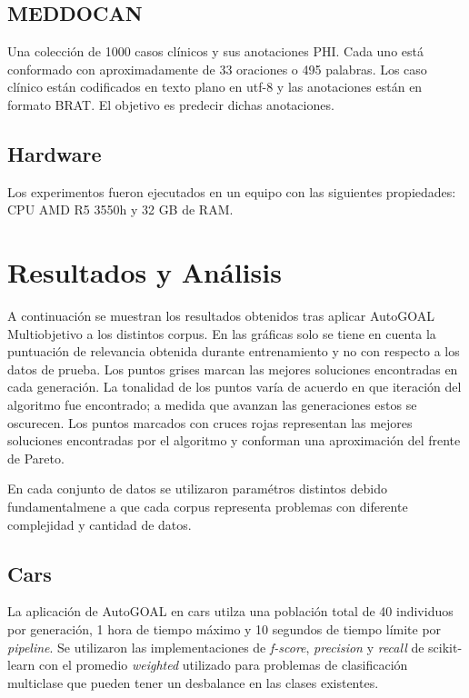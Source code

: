 \subsection{MEDDOCAN}

Una colecci\'on de 1000 casos cl\'inicos y sus anotaciones PHI. Cada uno est\'a conformado con aproximadamente de 33 oraciones o 495 palabras. Los caso cl\'inico est\'an codificados en texto plano en utf-8 y las anotaciones est\'an en formato BRAT. El objetivo es predecir dichas anotaciones.

\subsection{Hardware}
 Los experimentos fueron ejecutados en un equipo con las siguientes propiedades: CPU AMD R5 3550h y 32 GB de RAM.

\section{Resultados y An\'alisis}

A continuaci\'on se muestran los resultados obtenidos tras aplicar AutoGOAL Multiobjetivo a los distintos corpus. En las gr\'aficas solo se tiene en cuenta la puntuaci\'on de relevancia obtenida durante entrenamiento y no con respecto a los datos de prueba. Los puntos  grises marcan las mejores soluciones encontradas en cada generaci\'on.  La tonalidad de los puntos var\'ia de acuerdo en que iteraci\'on del algoritmo fue encontrado; a medida que avanzan las generaciones estos se oscurecen. Los puntos marcados con cruces rojas representan las mejores soluciones encontradas por el algoritmo y conforman una aproximaci\'on del frente de Pareto.

En cada conjunto de datos se utilizaron param\'etros distintos debido fundamentalmene a que cada corpus representa problemas con diferente complejidad y cantidad de datos.

\subsection{Cars}
La aplicaci\'on de AutoGOAL en cars  utilza una poblaci\'on total de 40 individuos por generaci\'on, 1 hora de tiempo m\'aximo y 10 segundos de tiempo l\'imite por \textit{pipeline}. Se utilizaron las implementaciones de \textit{f-score}, \textit{precision} y \textit{recall} de scikit-learn con el promedio \textit{weighted} utilizado para problemas de clasificaci\'on multiclase que pueden tener un desbalance en las clases existentes.

